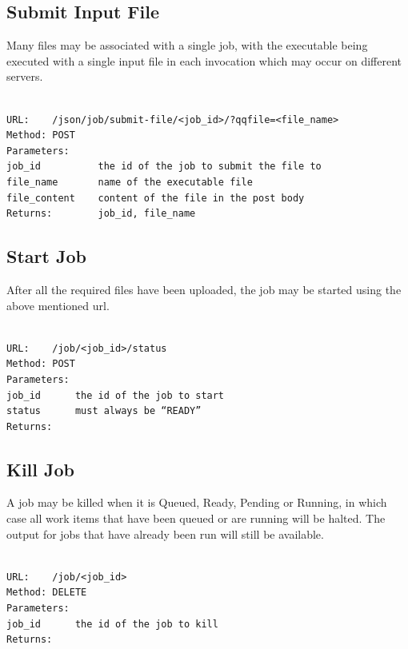 \subsection{Submit Input File}
\label{submitinputfile}

Many files may be associated with a single job, with the executable being executed with a single input file in each invocation which may occur on different servers.

\begin{adjustwidth}{2.5em}{2.5em}
\begin{verbatim}

URL:    /json/job/submit-file/<job_id>/?qqfile=<file_name>
Method: POST
Parameters: 
job_id          the id of the job to submit the file to
file_name       name of the executable file
file_content    content of the file in the post body
Returns:        job_id, file_name

\end{verbatim}
\end{adjustwidth}

\subsection{Start Job}
\label{startjob}

After all the required files have been uploaded, the job may be started using the above mentioned url.

\begin{adjustwidth}{2.5em}{2.5em}
\begin{verbatim}

URL:    /job/<job_id>/status
Method: POST
Parameters: 
job_id      the id of the job to start
status      must always be “READY”
Returns:

\end{verbatim}
\end{adjustwidth}

\subsection{Kill Job}
\label{killjob}

A job may be killed when it is Queued, Ready, Pending or Running, in which case all work items that have been queued or are running will be halted. The output for jobs that have already been run will still be available.

\begin{adjustwidth}{2.5em}{2.5em}
\begin{verbatim}

URL:    /job/<job_id>
Method: DELETE
Parameters: 
job_id      the id of the job to kill
Returns:

\end{verbatim}
\end{adjustwidth}

